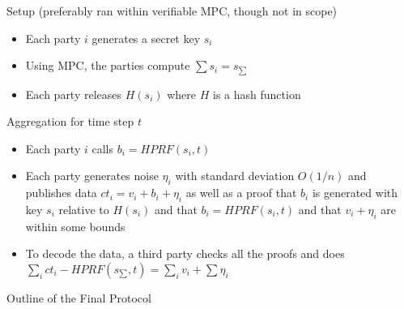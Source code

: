 \documentclass[11pt]{article}
\begin{document}
\begin{mdframed}
	Setup (preferably ran within verifiable MPC, though not in scope) \begin{itemize}
		\item Each party $i$ generates a secret key $s_i$
		\item Using MPC, the parties compute $\sum s_i = s_{\sum}$
		\item Each party releases $H(s_i)$ where $H$ is a hash function
	\end{itemize}
	Aggregation for time step $t$ \begin{itemize}
		\item Each party $i$ calls $b_i = HPRF(s_i, t)$ 
		\item Each party generates noise $\eta_i$ with standard deviation $O(1/n)$ and publishes data $ct_i = v_i + b_i + \eta_i$ as well as a proof that $b_i$ is generated with key $s_i$ relative to $H(s_i)$ and that $b_i = HPRF(s_i, t)$ and that $v_i + \eta_i$ are within some bounds
		\item To decode the data, a third party checks all the proofs and does $\sum_i ct_i - HPRF(s_{\sum}, t) = \sum_i v_i + \sum \eta_i$
	\end{itemize}
	\caption{Outline of the Final Protocol}
	\label{fig:prot}
\end{mdframed}



\end{document}
